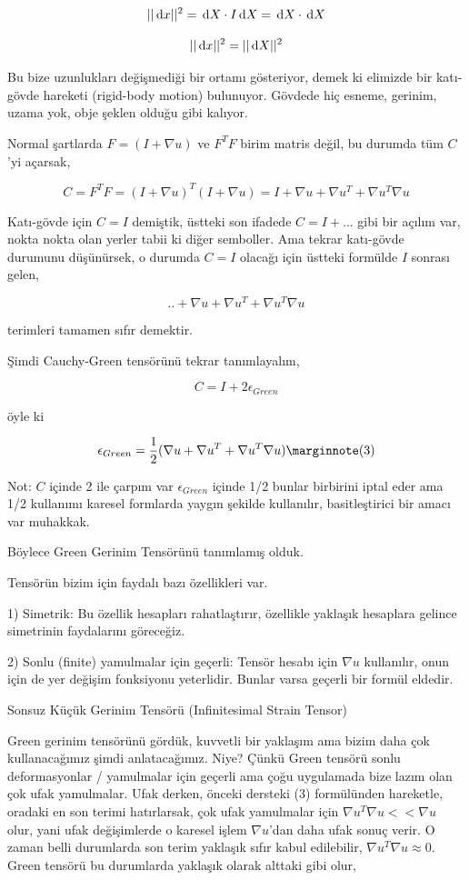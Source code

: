 \documentclass[12pt,fleqn]{article}\usepackage{../../common}
\begin{document}
$$
||\,\mathrm{d} x||^2  = \,\mathrm{d} X \cdot I \,\mathrm{d} X = \,\mathrm{d} X \cdot \,\mathrm{d} X
$$

$$
||\,\mathrm{d} x||^2 = ||\,\mathrm{d} X||^2
$$

Bu bize uzunlukları değişmediği bir ortamı gösteriyor, demek ki elimizde bir
katı-gövde hareketi (rigid-body motion) bulunuyor. Gövdede hiç esneme, gerinim,
uzama yok, obje şeklen olduğu gibi kalıyor.

Normal şartlarda $F = (I+\nabla u)$ ve $F^T F$ birim matris değil, bu durumda
tüm $C$'yi açarsak,

$$
C = F^T F = (I+\nabla u)^T (I+\nabla u) =
I + \nabla u + \nabla u^T + \nabla u^T \nabla u
$$

Katı-gövde için $C = I$ demiştik, üstteki son ifadede $C = I + ...$  gibi
bir açılım var, nokta nokta olan yerler tabii ki diğer semboller. Ama
tekrar katı-gövde durumunu düşünürsek, o durumda $C = I$ olacağı için
üstteki formülde $I$ sonrası gelen,

$$
.. + \nabla u + \nabla u^T + \nabla u^T \nabla u
$$

terimleri tamamen sıfır demektir.

Şimdi Cauchy-Green tensörünü tekrar tanımlayalım,

$$
C = I + 2 \epsilon_{Green} 
$$

öyle ki 

$$
\epsilon_{Green} = \frac{1}{2} (\nabla u + \nabla u^T + \nabla u^T \nabla u )
\mlabel{3}
$$

Not: $C$ içinde 2 ile çarpım var $\epsilon_{Green}$ içinde 1/2 bunlar birbirini
iptal eder ama 1/2 kullanımı karesel formlarda yaygın şekilde kullanılır,
basitleştirici bir amacı var muhakkak. 

Böylece Green Gerinim Tensörünü tanımlamış olduk.

Tensörün bizim için faydalı bazı özellikleri var.

1) Simetrik: Bu özellik hesapları rahatlaştırır, özellikle yaklaşık
hesaplara gelince simetrinin faydalarını göreceğiz. 

2) Sonlu (finite) yamulmalar için geçerli: Tensör hesabı için $\nabla u$
kullanılır, onun için de yer değişim fonksiyonu yeterlidir. Bunlar varsa geçerli
bir formül eldedir.

Sonsuz Küçük Gerinim Tensörü (Infinitesimal Strain Tensor)

Green gerinim tensörünü gördük, kuvvetli bir yaklaşım ama bizim daha çok
kullanacağımız şimdi anlatacağımız. Niye? Çünkü Green tensörü sonlu
deformasyonlar / yamulmalar için geçerli ama çoğu uygulamada bize lazım olan çok
ufak yamulmalar. Ufak derken, önceki dersteki (3) formülünden hareketle, oradaki
en son terimi hatırlarsak, çok ufak yamulmalar için $\nabla u^T \nabla u << \nabla u$ 
olur, yani ufak değişimlerde o karesel işlem $\nabla u$'dan daha ufak sonuç
verir. O zaman belli durumlarda son terim yaklaşık sıfır kabul edilebilir,
$\nabla u^T \nabla u \approx 0$. Green tensörü bu durumlarda yaklaşık
olarak alttaki gibi olur,
\end{document}
